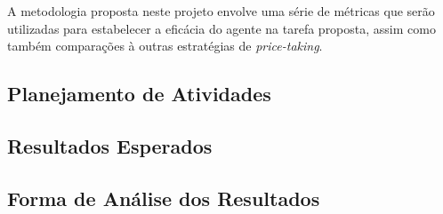 
A metodologia proposta neste projeto envolve uma série de métricas que serão utilizadas para estabelecer a eficácia do agente na tarefa proposta, assim como também comparações à outras estratégias de \textit{price-taking}.

\subsection{Planejamento de Atividades}
\label{section:activities}


\subsection{Resultados Esperados}
\label{section:results}


\subsection{Forma de Análise dos Resultados}
\label{section:metrics}


